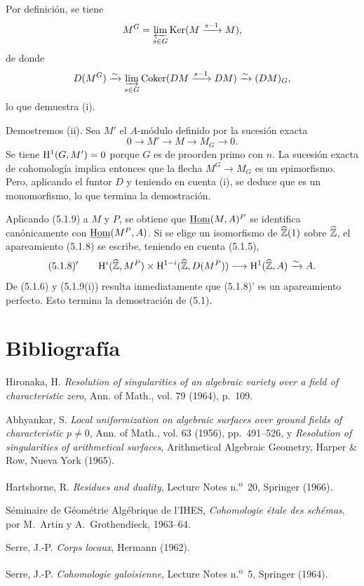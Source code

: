 \begin{prooftext}[Demostración]
Por definición, se tiene
\[
M^G=\varprojlim_{s\in G}\operatorname{Ker}(M\xrightarrow{s-1}M),
\]
de donde
\[
D(M^G)\xrightarrow{\sim}\varinjlim_{s\in G}\operatorname{Coker}(DM\xrightarrow{s-1}DM)\xrightarrow{\sim}(DM)_G,
\]
lo que demuestra (i).

Demostremos (ii). Sea $M'$ el $A$-módulo definido por la sucesión exacta
\[
0\longrightarrow M'\longrightarrow M\longrightarrow M_G\longrightarrow0.
\]
Se tiene $\mathrm{H}^1(G,M')=0$ porque $G$ es de proorden primo con $n$. La sucesión exacta de cohomología implica entonces que la flecha $M^G\to M_G$ es un epimorfismo. Pero, aplicando el funtor $D$ y teniendo en cuenta (i), se deduce que es un monomorfismo, lo que termina la demostración.
\end{prooftext}

Aplicando (5.1.9) a $M$ y $P$, se obtiene que $\underline{\operatorname{Hom}}(M,A)^P$ se identifica canónicamente con $\underline{\operatorname{Hom}}(M^P,A)$. Si se elige un isomorfismo de $\widehat{\mathbb{Z}}(1)$ sobre $\widehat{\mathbb{Z}}$, el apareamiento (5.1.8) se escribe, teniendo en cuenta (5.1.5),
\[
(5.1.8)'\qquad \mathrm{H}^i(\widehat{\mathbb{Z}},M^P)\times\mathrm{H}^{1-i}(\widehat{\mathbb{Z}},D(M^P))\longrightarrow\mathrm{H}^1(\widehat{\mathbb{Z}},A)\xrightarrow{\sim}A.
\]
De (5.1.6) y (5.1.9(i)) resulta inmediatamente que (5.1.8)' es un apareamiento perfecto. Esto termina la demostración de (5.1).

\section*{Bibliografía}

\begin{description}[leftmargin=2.5cm,style=nextline]
\item[{[2]}] Hironaka, H. \emph{Resolution of singularities of an algebraic variety over a field of characteristic zero}, Ann. of Math., vol. 79 (1964), p.~109.
\item[{[1]}] Abhyankar, S. \emph{Local uniformization on algebraic surfaces over ground fields of characteristic $p\ne0$}, Ann. of Math., vol. 63 (1956), pp.~491--526, y \emph{Resolution of singularities of arithmetical surfaces}, Arithmetical Algebraic Geometry, Harper \& Row, Nueva York (1965).
\item[{[H]}] Hartshorne, R. \emph{Residues and duality}, Lecture Notes n.\textsuperscript{o}~20, Springer (1966).
\item[{[SGAA]}] Séminaire de Géométrie Algébrique de l'IHES, \emph{Cohomologie étale des schémas}, por M.~Artin y A.~Grothendieck, 1963--64.
\item[{[CL]}] Serre, J.-P. \emph{Corps locaux}, Hermann (1962).
\item[{[CG]}] Serre, J.-P. \emph{Cohomologie galoisienne}, Lecture Notes n.\textsuperscript{o}~5, Springer (1964).
\end{description}
